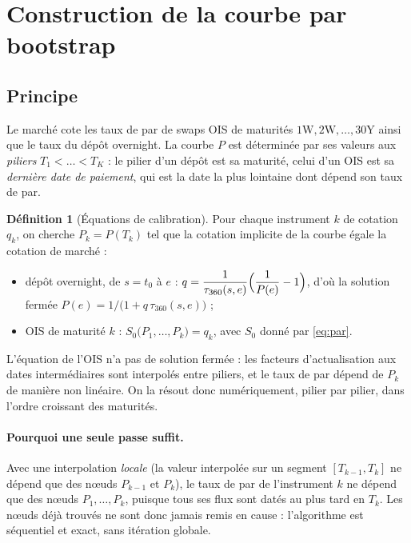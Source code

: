 \documentclass[11pt,a4paper]{article}
\newcommand{\DF}[1]{P(#1)}
\theoremstyle{plain}
\theoremstyle{definition}
\newtheorem{definition}{Définition}
\theoremstyle{remark}
\begin{document}
\section{Construction de la courbe par bootstrap}\label{sec:bootstrap}

\subsection{Principe}

Le marché cote les taux de par de swaps OIS de maturités $1\text{W},2\text{W},\dots,30\text{Y}$ ainsi
que le taux du dépôt overnight. La courbe $P$ est déterminée par ses valeurs aux \emph{piliers}
$T_1<\dots<T_K$ : le pilier d'un dépôt est sa maturité, celui d'un OIS est sa \emph{dernière date de
paiement}, qui est la date la plus lointaine dont dépend son taux de par.

\begin{definition}[Équations de calibration]
Pour chaque instrument $k$ de cotation $q_k$, on cherche $P_k=\DF{T_k}$ tel que la cotation
implicite de la courbe égale la cotation de marché :
\begin{itemize}
  \item dépôt overnight, de $s=t_0$ à $e$ : $q=\dfrac{1}{\tau_{360}(s,e)}\Bigl(\dfrac{1}{\DF{e}}-1\Bigr)$,
        d'où la solution fermée $\DF{e}=1/\bigl(1+q\,\tau_{360}(s,e)\bigr)$ ;
  \item OIS de maturité $k$ : $S_0\bigl(P_1,\dots,P_k\bigr)=q_k$, avec $S_0$ donné par
        \eqref{eq:par}.
\end{itemize}
\end{definition}

L'équation de l'OIS n'a pas de solution fermée : les facteurs d'actualisation aux dates
intermédiaires sont interpolés entre piliers, et le taux de par dépend de $P_k$ de manière non
linéaire. On la résout donc numériquement, pilier par pilier, dans l'ordre croissant des maturités.

\paragraph{Pourquoi une seule passe suffit.} Avec une interpolation \emph{locale} (la valeur
interpolée sur un segment $[T_{k-1},T_k]$ ne dépend que des nœuds $P_{k-1}$ et $P_k$), le taux de par
de l'instrument $k$ ne dépend que des nœuds $P_1,\dots,P_k$, puisque tous ses flux sont datés au plus
tard en $T_k$. Les nœuds déjà trouvés ne sont donc jamais remis en cause : l'algorithme est séquentiel
et exact, sans itération globale.
\end{document}
